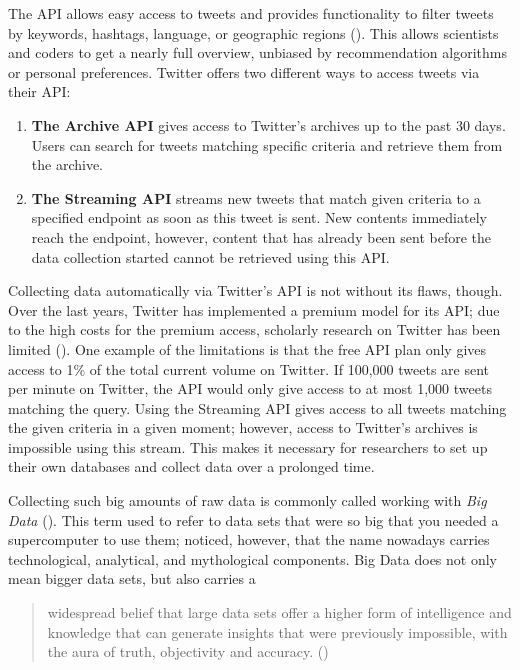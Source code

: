 The API allows easy access to tweets and provides functionality to filter tweets by keywords, hashtags, language, or geographic regions (\cite{bello2017detecting}). This allows scientists and coders to get a nearly full overview, unbiased by recommendation algorithms or personal preferences. Twitter offers two different ways to access tweets via their API:

\begin{enumerate}
    \item \textbf{The Archive API} gives access to Twitter's archives up to the past 30 days. Users can search for tweets matching specific criteria and retrieve them from the archive.
    \item \textbf{The Streaming API} streams new tweets that match given criteria to a specified endpoint as soon as this tweet is sent. New contents immediately reach the endpoint, however, content that has already been sent before the data collection started cannot be retrieved using this API.
\end{enumerate}

Collecting data automatically via Twitter's API is not without its flaws, though. Over the last years, Twitter has implemented a premium model for its API; due to the high costs for the premium access, scholarly research on Twitter has been limited (\cite{brunsTwitterDataWhat2014}). One example of the limitations is that the free API plan only gives access to 1\% of the total current volume on Twitter. If 100,000 tweets are sent per minute on Twitter, the API would only give access to at most 1,000 tweets matching the query. Using the Streaming API gives access to all tweets matching the given criteria in a given moment; however, access to Twitter's archives is impossible using this stream. This makes it necessary for researchers to set up their own databases and collect data over a prolonged time.

Collecting such big amounts of raw data is commonly called working with \emph{Big Data} (\cite{crawfordCriticalQuestionsBig2012}). This term used to refer to data sets that were so big that you needed a supercomputer to use them; \citeauthor{crawfordCriticalQuestionsBig2012} noticed, however, that the name nowadays carries technological, analytical, and mythological components. Big Data does not only mean bigger data sets, but also carries a 

\begin{quote}
    widespread belief that large data sets offer a higher form of intelligence and knowledge that can generate insights that were previously impossible, with the aura of truth, objectivity and accuracy. (\cite[3]{crawfordCriticalQuestionsBig2012})
\end{quote}

